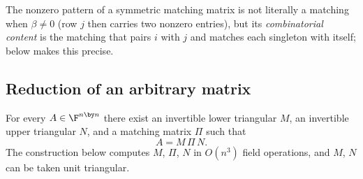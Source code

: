 The nonzero pattern of a symmetric matching matrix is not literally a
matching when $\beta \neq 0$ (row $j$ then carries two nonzero entries), but
its \emph{combinatorial content} is the matching that pairs $i$ with $j$ and
matches each singleton with itself;  below makes this
precise.

\subsection{Reduction of an arbitrary matrix}

\begin{lemma}\label{lem:reduction-lu}
  For every $A \in \F^{n \by n}$ there exist an invertible lower triangular
  $M$, an invertible upper triangular $N$, and a matching matrix $\Pi$ such
  that
  \[
    A = M \, \Pi \, N .
  \]
  The construction below computes $M$, $\Pi$, $N$ in $O(n^3)$ field
  operations, and $M$, $N$ can be taken unit triangular.
\end{lemma}

